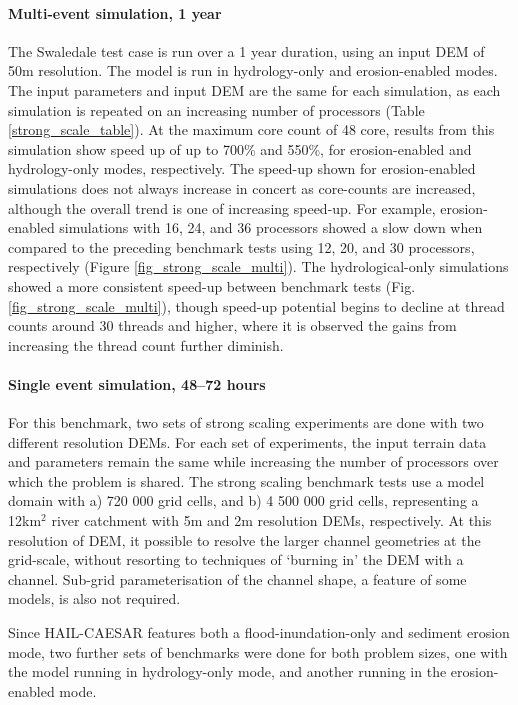 \paragraph*{Multi-event simulation, 1 year}
The Swaledale test case is run over a 1 year duration, using an input DEM of 50m resolution. The model is run in hydrology-only and erosion-enabled modes. The input parameters and input DEM are the same for each simulation, as each simulation is repeated on an increasing number of processors (Table \ref{strong_scale_table}). At the maximum core count of 48 core, results from this simulation show speed up of up to 700\% and 550\%, for erosion-enabled and hydrology-only modes, respectively. The speed-up shown for erosion-enabled simulations does not always increase in concert as core-counts are increased, although the overall trend is one of increasing speed-up. For example, erosion-enabled simulations with 16, 24, and 36 processors showed a slow down when compared to the preceding benchmark tests using 12, 20, and 30 processors, respectively (Figure \ref{fig_strong_scale_multi}). The hydrological-only simulations showed a more consistent speed-up between benchmark tests (Fig. \ref{fig_strong_scale_multi}), though speed-up potential begins to decline at thread counts around 30 threads and higher, where it is observed the gains from increasing the thread count further diminish.

\paragraph*{Single event simulation, 48--72 hours}

For this benchmark, two sets of strong scaling experiments are done with two different resolution DEMs. For each set of experiments, the input terrain data and parameters remain the same while increasing the number of processors over which the problem is shared. The strong scaling benchmark tests use a model domain with a) 720 000 grid cells, and b) 4 500 000 grid cells, representing a 12km$^2$ river catchment with 5m and 2m resolution DEMs, respectively. At this resolution of DEM, it possible to resolve the larger channel geometries at the grid-scale, without resorting to techniques of `burning in' the DEM with a channel. Sub-grid parameterisation of the channel shape, a feature of some models, is also not required.

Since HAIL-CAESAR features both a flood-inundation-only and sediment erosion mode, two further sets of benchmarks were done for both problem sizes, one with the model running in hydrology-only mode, and another running in the erosion-enabled mode.

